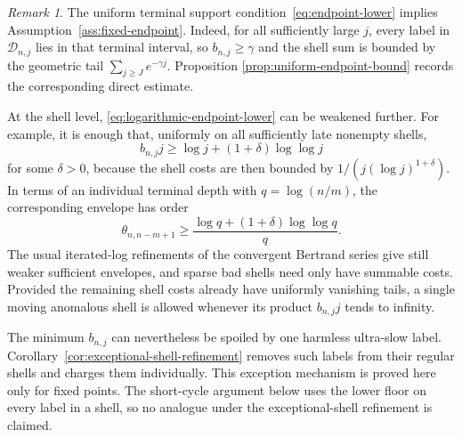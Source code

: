 \documentclass[11pt]{article}
\theoremstyle{remark}
\newtheorem{remark}[theorem]{Remark}
\theoremstyle{plain}
\begin{document}
\begin{remark}\label{rmk:minimal-tail}
The uniform terminal support condition~\eqref{eq:endpoint-lower} implies
Assumption~\ref{ass:fixed-endpoint}.  Indeed, for all sufficiently large
$j$, every label in $\mathcal D_{n,j}$ lies in that terminal interval, so
$b_{n,j}\ge\gamma$ and the shell sum is bounded by the geometric tail
$\sum_{j\ge J}e^{-\gamma j}$.  Proposition
\ref{prop:uniform-endpoint-bound} records the corresponding direct estimate.

At the shell level, \eqref{eq:logarithmic-endpoint-lower} can be weakened
further.  For example,
it is enough that, uniformly on all sufficiently late nonempty shells,
\begin{equation}\label{eq:bertrand-shell-envelope}
 b_{n,j}j
 \ge \log j+(1+\delta)\log\log j
\end{equation}
for some $\delta>0$, because the shell costs are then bounded by
$1/(j(\log j)^{1+\delta})$.  In terms of an individual terminal depth with
$q=\log(n/m)$, the corresponding envelope has order
\[
 \theta_{n,n-m+1}
 \ge
 \frac{\log q+(1+\delta)\log\log q}{q}.
\]
The usual iterated-log refinements of the convergent Bertrand series give
still weaker sufficient envelopes, and sparse bad shells need only have
summable costs.  Provided the remaining shell costs already have uniformly
vanishing tails, a single moving anomalous shell is allowed whenever its
product $b_{n,j}j$ tends to infinity.

The minimum $b_{n,j}$ can nevertheless be spoiled by one harmless ultra-slow
label.  Corollary~\ref{cor:exceptional-shell-refinement} removes such labels
from their regular shells and charges them individually.  This exception
mechanism is proved here only for fixed points.  The short-cycle argument
below uses the lower floor on every label in a shell, so no analogue under
the exceptional-shell refinement is claimed.
\end{remark}
\end{document}
